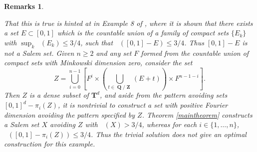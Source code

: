 \documentclass[12pt,reqno]{article}
\numberwithin{equation}{section}
\DeclareMathOperator{\minkdim}{\dim_{\mathbf{M}}}
\DeclareMathOperator{\fordim}{\dim_{\mathbf{F}}}
\DeclareMathOperator{\ZZ}{\mathbf{Z}}
\DeclareMathOperator{\QQ}{\mathbf{Q}}
\newtheorem{remarks}[theorem]{Remarks}
\numberwithin{theorem}{section}
\begin{document}
\begin{remarks}
\begin{enumerate}
        That this is true is hinted at in Example 8 of \cite{Ekstrom2014}, where it is shown that there exists a set $E \subset [0,1]$ which is the countable union of a family of compact sets $\{ E_k \}$ with $\sup_k \minkdim(E_k) \leq 3/4$, such that $\fordim([0,1] - E) \leq 3/4$. Thus $[0,1] - E$ is not a Salem set. Given $n \geq 2$ and any set $F$ formed from the countable union of compact sets with Minkowski dimension zero, consider the set
        \[ Z = \bigcup_{i = 0}^{n-1} \left[ F^i \times  \left( \bigcup_{t \in \QQ / \ZZ} (E + t) \right) \times F^{n - 1 - i} \right]. \]
        Then $Z$ is a dense subset of $\mathbf{T}^d$, and aside from the pattern avoiding sets $[0,1]^d - \pi_i(Z)$, it is nontrivial to construct a set with positive Fourier dimension avoiding the pattern specified by $Z$. Theorem \ref{maintheorem} constructs a Salem set $X$ avoiding $Z$ with $\fordim(X) > 3/4$, whereas for each $i \in \{ 1, \dots, n \}$, $\fordim([0,1] - \pi_i(Z)) \leq 3/4$. Thus the trivial solution does not give an optimal construction for this example.
    \end{enumerate}
\end{remarks}
\end{document}
